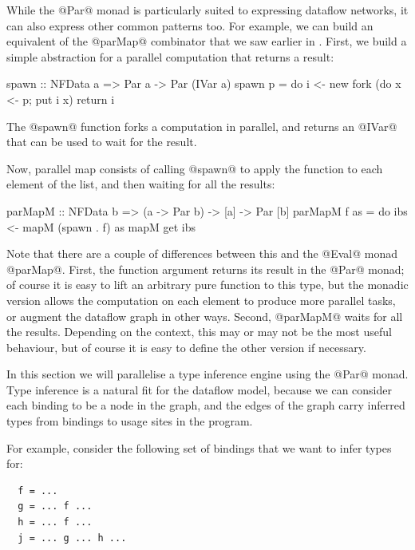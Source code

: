 While the @Par@ monad is particularly suited to expressing dataflow
networks, it can also express other common patterns too.  For example,
we can build an equivalent of the @parMap@ combinator that we saw
earlier in .  First, we build a simple abstraction
for a parallel computation that returns a result:

\begin{haskell}
spawn :: NFData a => Par a -> Par (IVar a)
spawn p = do
  i <- new
  fork (do x <- p; put i x)
  return i
\end{haskell}

\noindent The @spawn@ function forks a computation in parallel, and
returns an @IVar@ that can be used to wait for the result.

Now, parallel map consists of calling @spawn@ to apply the function to
each element of the list, and then waiting for all the results:

\begin{haskell}
parMapM :: NFData b => (a -> Par b) -> [a] -> Par [b]
parMapM f as = do
  ibs <- mapM (spawn . f) as
  mapM get ibs
\end{haskell}

\noindent Note that there are a couple of differences between this and
the @Eval@ monad @parMap@.  First, the function argument returns its
result in the @Par@ monad; of course it is easy to lift an arbitrary
pure function to this type, but the monadic version allows the
computation on each element to produce more parallel tasks, or augment
the dataflow graph in other ways.  Second, @parMapM@ waits for all the
results.  Depending on the context, this may or may not be the most
useful behaviour, but of course it is easy to define the other version
if necessary.


In this section we will parallelise a type inference engine using the
@Par@ monad.  Type inference is a natural fit for the dataflow model,
because we can consider each binding to be a node in the graph, and
the edges of the graph carry inferred types from bindings to usage
sites in the program.

For example, consider the following set of bindings that we
want to infer types for:

{\small \begin{verbatim}
  f = ...
  g = ... f ...
  h = ... f ...
  j = ... g ... h ...
\end{verbatim}}

